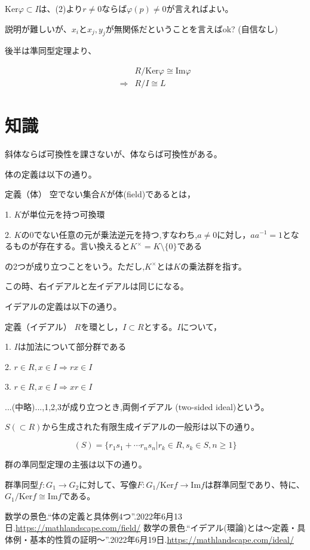 \documentclass[a4paper, 10pt, dvipdfmx]{jlreq}
\begin{document}
$\mathrm{Ker}\varphi \subset I$は、(2)より$r\neq 0$ならば$\varphi(p) \neq 0$が言えればよい。

説明が難しいが、$x_i$と$x_j,y_j$が無関係だということを言えばok? (自信なし)

後半は準同型定理より、

\begin{align*}
              & R/\mathrm{Ker}{\varphi} \cong \mathrm{Im}{\varphi} \\
  \Rightarrow & R/I \cong L
\end{align*}

\section{知識}

斜体ならば可換性を課さないが、体ならば可換性がある。

体の定義は以下の通り。

\begin{itembox}[l]{ 定義（体）}
  空でない集合$K$が体(field)であるとは，

  1. $K$が単位元を持つ可換環

  2. $K$の0でない任意の元が乗法逆元を持つ,すなわち,$a \neq 0$に対し，$aa^{-1}=1$となるものが存在する。言い換えると$K^{\times}=K\setminus\{0\}$である

  の2つが成り立つことをいう。ただし,$K^{\times}$とは$K$の乗法群を指す。
\end{itembox}

この時、右イデアルと左イデアルは同じになる。

イデアルの定義は以下の通り。

\begin{itembox}[l]{ 定義（イデアル）}
  $R$を環とし，$I \subset R$とする。$I$について，

  1. $I$は加法について部分群である

  2. $r \in R, x \in I \Rightarrow rx \in I$

  3. $r \in R, x \in I \Rightarrow xr \in I$

  ...(中略)...,1,2,3が成り立つとき,両側イデアル (two-sided ideal)という。
\end{itembox}

$S (\subset R)$から生成された有限生成イデアルの一般形は以下の通り。

\begin{equation*}
  (S)=\{r_1 s_1+\cdots r_n s_n | r_k \in R, s_k \in S, n \geq 1 \}
\end{equation*}

群の準同型定理の主張は以下の通り。

群準同型$f \colon G_1 \to G_2$に対して、写像$F \colon G_1/\mathrm{Ker}f \to \mathrm{Im}f$は群準同型であり、特に、$G_1/\mathrm{Ker}f \cong \mathrm{Im}f$である。


\begin{thebibliography}{9}
  数学の景色.``体の定義と具体例4つ''.2022年6月13日.\url{https://mathlandscape.com/field/}
  数学の景色.``イデアル(環論)とは～定義・具体例・基本的性質の証明～''.2022年6月19日.\url{https://mathlandscape.com/ideal/}
\end{thebibliography}
\end{document}

